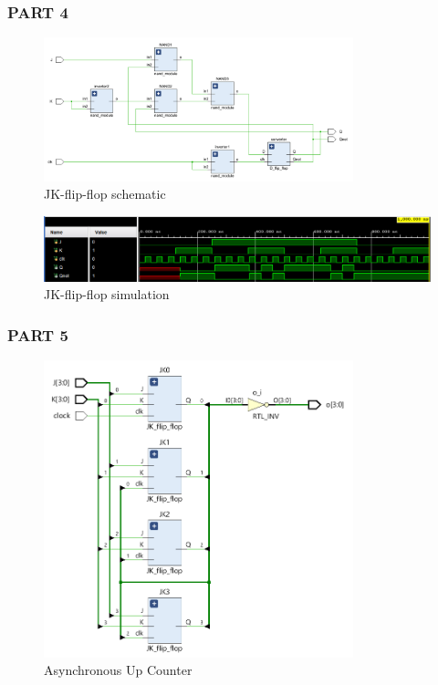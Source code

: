 \documentclass[pdftex,12pt,a4paper]{article}
\begin{document}
\subsubsection{PART 4}

\begin{figure}[H]
    	\centering
    	\includegraphics[width=0.8\textwidth]{schematic/JK_schem.png}	
    	\caption{JK-flip-flop schematic}
    	\label{JK-flip-flop schematic}
    \end{figure}
    
    \begin{figure}[H]
    	\centering
    	\includegraphics[width=1\textwidth]{simulations/JK_sim.png}	
    	\caption{JK-flip-flop simulation}
    	\label{JK-flip-flop simulation}
    \end{figure}


\subsubsection{PART 5}

\begin{figure}[H]
    	\centering
    	\includegraphics[width=0.8\textwidth]{schematic/async.png}	
    	\caption{Asynchronous Up Counter}
    	\label{Asynchronous Up Counter}
    \end{figure}
    
\end{document}
